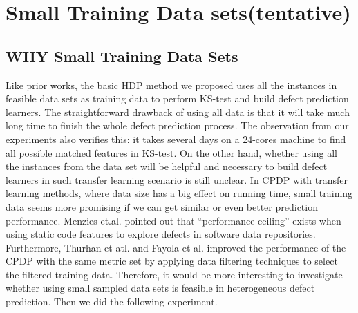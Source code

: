 \section{Small Training Data sets(tentative)}
\label{sec: small_data_sets}

\subsection{WHY Small Training Data Sets}
Like prior works\cite{nam2013transfer, ma2012transfer, rahman2012recalling, ryu2014value, zhang2014towards}, the basic HDP method we proposed uses all the instances in feasible data sets as training data to perform KS-test and build defect prediction learners. The straightforward drawback of using all data is that it will take much long time to finish the whole defect prediction process. The observation from our experiments also verifies this: it takes several days on a 24-cores machine to find all possible matched features in KS-test. On the other hand, whether using all the instances from the data set will be helpful and necessary to build defect learners in such transfer learning scenario is still unclear. In CPDP with transfer learning methods, where data size has a big effect on running time, small training data seems more promising if we can get similar or even better prediction performance. Menzies et.al. \cite{menzies2008implications} pointed out that ``performance ceiling'' exists when using static code features to explore defects in software data repositories.  Furthermore, Thurhan et atl.\cite{turhan2009relative} and Fayola et al.\cite{peters2013better} improved the  performance of the CPDP with the same metric set by applying data filtering techniques to select the filtered training data. Therefore, it would be more interesting to investigate whether using small sampled data sets is feasible in heterogeneous defect prediction. Then we did the following experiment.

